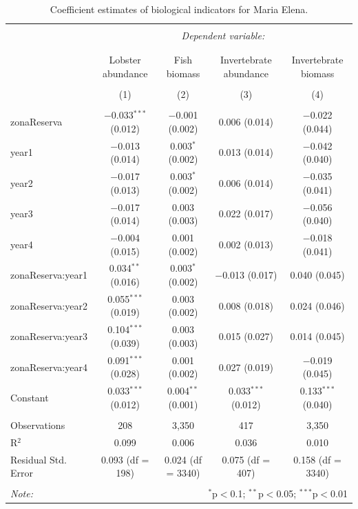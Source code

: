 \documentclass[utf8]{frontiers_suppmat} %
\begin{document}
\begin{table}[!htbp] \centering 
  \caption{Coefficient estimates of biological indicators for Maria Elena.} 
  \label{} 
\tiny 
\begin{tabular}{@{\extracolsep{1pt}}lcccc} 
\\[-1.8ex]\hline 
\hline \\[-1.8ex] 
 & \multicolumn{4}{c}{\textit{Dependent variable:}} \\ 
\cline{2-5} 
\\[-1.8ex] & \multicolumn{4}{c}{} \\ 
 & Lobster abundance & Fish biomass & Invertebrate abundance & Invertebrate biomass \\ 
\\[-1.8ex] & (1) & (2) & (3) & (4)\\ 
\hline \\[-1.8ex] 
 zonaReserva & $-$0.033$^{***}$ (0.012) & $-$0.001 (0.002) & 0.006 (0.014) & $-$0.022 (0.044) \\ 
  year1 & $-$0.013 (0.014) & 0.003$^{*}$ (0.002) & 0.013 (0.014) & $-$0.042 (0.040) \\ 
  year2 & $-$0.017 (0.013) & 0.003$^{*}$ (0.002) & 0.006 (0.014) & $-$0.035 (0.041) \\ 
  year3 & $-$0.017 (0.014) & 0.003 (0.003) & 0.022 (0.017) & $-$0.056 (0.040) \\ 
  year4 & $-$0.004 (0.015) & 0.001 (0.002) & 0.002 (0.013) & $-$0.018 (0.041) \\ 
  zonaReserva:year1 & 0.034$^{**}$ (0.016) & 0.003$^{*}$ (0.002) & $-$0.013 (0.017) & 0.040 (0.045) \\ 
  zonaReserva:year2 & 0.055$^{***}$ (0.019) & 0.003 (0.002) & 0.008 (0.018) & 0.024 (0.046) \\ 
  zonaReserva:year3 & 0.104$^{***}$ (0.039) & 0.003 (0.003) & 0.015 (0.027) & 0.014 (0.045) \\ 
  zonaReserva:year4 & 0.091$^{***}$ (0.028) & 0.001 (0.002) & 0.027 (0.019) & $-$0.019 (0.045) \\ 
  Constant & 0.033$^{***}$ (0.012) & 0.004$^{**}$ (0.001) & 0.033$^{***}$ (0.012) & 0.133$^{***}$ (0.040) \\ 
 \hline \\[-1.8ex] 
Observations & 208 & 3,350 & 417 & 3,350 \\ 
R$^{2}$ & 0.099 & 0.006 & 0.036 & 0.010 \\ 
Residual Std. Error & 0.093 (df = 198) & 0.024 (df = 3340) & 0.075 (df = 407) & 0.158 (df = 3340) \\ 
\hline 
\hline \\[-1.8ex] 
\textit{Note:}  & \multicolumn{4}{r}{$^{*}$p$<$0.1; $^{**}$p$<$0.05; $^{***}$p$<$0.01} \\ 
\end{tabular} 
\end{table}
\end{document}
